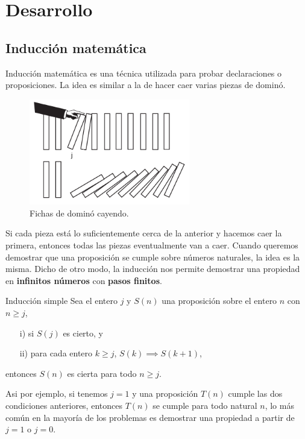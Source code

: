 \section{Desarrollo}

\subsection{Inducción matemática}

Inducción matemática es una técnica utilizada para probar declaraciones o proposiciones.
La idea es similar a la de hacer caer varias piezas de dominó.
\begin{figure}[htb]
    \centering
    \includegraphics[width=7cm]{images/dominoes-fall}
    \caption{Fichas de dominó cayendo.}
    \label{fig:figure}
\end{figure}
Si cada pieza está lo suficientemente cerca de la anterior y hacemos caer la primera, entonces todas las piezas eventualmente van a caer.
Cuando queremos demostrar que una proposición se cumple sobre números naturales, la idea es la misma.
Dicho de otro modo, la inducción nos permite demostrar una propiedad en \textbf{infinitos números} con \textbf{pasos finitos}.

\begin{principle.box}{Inducción simple}{}
    Sea el entero $j$ y $S(n)$ una proposición sobre el entero $n$ con $n \geq j$,
    \begin{itemize}
        \item[i)] si $S(j)$ es cierto, y
        \item[ii)] para cada entero $k \geq j$, $S(k) \implies S(k + 1)$,
    \end{itemize}
    entonces $S(n)$ es cierta para todo $n \geq j$.
\end{principle.box}
Asi por ejemplo, si tenemos $j = 1$ y una proposición $T(n)$ cumple las dos condiciones anteriores,
entonces $T(n)$ se cumple para todo natural $n$, lo más común en la mayoría de los problemas es demostrar una propiedad
a partir de $j = 1$ o $j = 0$.

